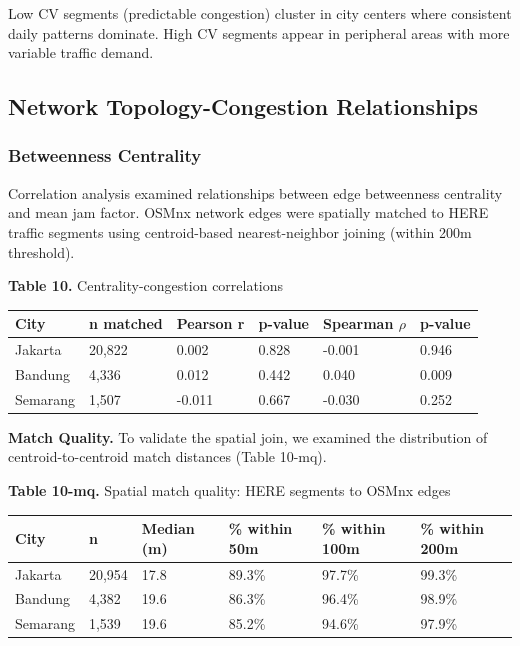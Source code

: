 \documentclass[12pt,a4paper]{article}
\begin{document}
Low CV segments (predictable congestion) cluster in city centers where consistent daily patterns dominate. High CV segments appear in peripheral areas with more variable traffic demand.

\subsection{Network Topology-Congestion Relationships}

\subsubsection{Betweenness Centrality}

Correlation analysis examined relationships between edge betweenness centrality and mean jam factor. OSMnx network edges were spatially matched to HERE traffic segments using centroid-based nearest-neighbor joining (within 200m threshold).

\textbf{Table 10.} Centrality-congestion correlations

\begin{longtable}[]{@{}llllll@{}}
\toprule\noalign{}
City & n matched & Pearson r & p-value & Spearman $\rho$ & p-value \\
\midrule\noalign{}
\endhead
\bottomrule\noalign{}
\endlastfoot
Jakarta & 20,822 & 0.002 & 0.828 & -0.001 & 0.946 \\
Bandung & 4,336 & 0.012 & 0.442 & 0.040 & 0.009 \\
Semarang & 1,507 & -0.011 & 0.667 & -0.030 & 0.252 \\
\end{longtable}

\textbf{Match Quality.} To validate the spatial join, we examined the distribution of centroid-to-centroid match distances (Table 10-mq).

\textbf{Table 10-mq.} Spatial match quality: HERE segments to OSMnx edges

\begin{longtable}[]{@{}llllll@{}}
\toprule\noalign{}
City & n & Median (m) & \% within 50m & \% within 100m & \% within 200m \\
\midrule\noalign{}
\endhead
\bottomrule\noalign{}
\endlastfoot
Jakarta & 20,954 & 17.8 & 89.3\% & 97.7\% & 99.3\% \\
Bandung & 4,382 & 19.6 & 86.3\% & 96.4\% & 98.9\% \\
Semarang & 1,539 & 19.6 & 85.2\% & 94.6\% & 97.9\% \\
\end{longtable}
\end{document}
